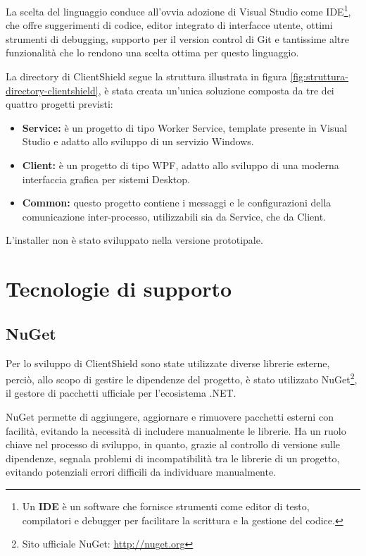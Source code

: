\documentclass[12pt,a4paper,openright,twoside]{book}
\begin{document}
La scelta del linguaggio conduce all'ovvia adozione di Visual Studio come \gls{IDE}\footnote{Un \textbf{\gls{IDE}} è un software che fornisce strumenti come editor di testo, compilatori e debugger per facilitare la scrittura e la gestione del codice.}, che offre suggerimenti di codice, editor integrato di interfacce utente, ottimi strumenti di debugging, supporto per il version control di Git e tantissime altre funzionalità che lo rendono una scelta ottima per questo linguaggio.

La directory di ClientShield segue la struttura illustrata in figura \ref{fig:struttura-directory-clientshield}, è stata creata un'unica soluzione composta da tre dei quattro progetti previsti:
\begin{itemize}
	\item \textbf{Service:}
	è un progetto di tipo Worker Service, template presente in Visual Studio e adatto allo sviluppo di un servizio Windows.
	
	\item \textbf{Client:}
	è un progetto di tipo \gls{WPF}, adatto allo sviluppo di una moderna interfaccia grafica per sistemi Desktop.
	
	\item \textbf{Common:}
	questo progetto contiene i messaggi e le configurazioni della comunicazione inter-processo, utilizzabili sia da Service, che da Client.
\end{itemize}
L'installer non è stato sviluppato nella versione prototipale.

\section{Tecnologie di supporto}

\subsection*{NuGet}

Per lo sviluppo di ClientShield sono state utilizzate diverse librerie esterne, perciò, allo scopo di gestire le dipendenze del progetto, è stato utilizzato NuGet\footnote{Sito ufficiale NuGet: \url{http://nuget.org}}, il gestore di pacchetti ufficiale per l'ecosistema .NET.

NuGet permette di aggiungere, aggiornare e rimuovere pacchetti esterni con facilità, evitando la necessità di includere manualmente le librerie.
Ha un ruolo chiave nel processo di sviluppo, in quanto, grazie al controllo di versione sulle dipendenze, segnala problemi di incompatibilità tra le librerie di un progetto, evitando potenziali errori difficili da individuare manualmente.
\end{document}
